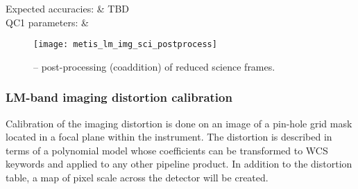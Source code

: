 \begin{recipedef}
  Expected accuracies: & TBD                                                        \\
  QC1 parameters:      &                                    \\
\end{recipedef}

\begin{figure}[hb]
  \centering
  \texttt{[image: metis\_lm\_img\_sci\_postprocess]}
  \caption[Recipe: ]{%
     -- post-processing (coaddition)
    of reduced  science frames.}
  \label{fig:metis_lm_img_sci_postprocess}
\end{figure}

\clearpage
\subsubsection{LM-band imaging distortion calibration}
\label{rec:metis_lm_img_distortion}
\label{lm_img_distortion}
\label{rec:lm_img_distortion}
\label{sssec:lm_img_distortion}

Calibration of the imaging distortion is done on an image of a
pin-hole grid mask located in a focal plane within the instrument. The
distortion is described in terms of a polynomial model whose
coefficients can be transformed to WCS keywords and applied to any
other pipeline product. In addition to the distortion table, a map of
pixel scale across the detector will be created.

